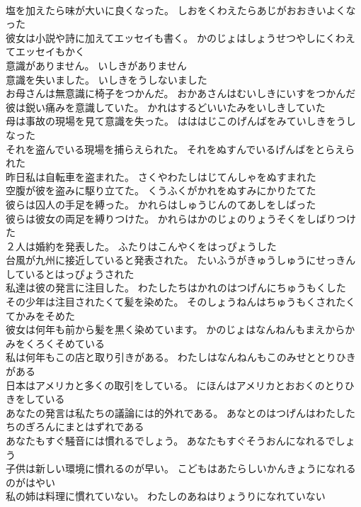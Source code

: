 \documentclass[8pt]{extreport}
\begin{document}
\begin{CJK}{UTF8}{min}
\\	塩を加えたら味が大いに良くなった。	しおをくわえたらあじがおおきいよくなった 
\\	彼女は小説や詩に加えてエッセイも書く。	かのじょはしょうせつやしにくわえてエッセイもかく 
\\	意識がありません。	いしきがありません 
\\	意識を失いました。	いしきをうしないました 
\\	お母さんは無意識に椅子をつかんだ。	おかあさんはむいしきにいすをつかんだ 
\\	彼は鋭い痛みを意識していた。	かれはするどいいたみをいしきしていた 
\\	母は事故の現場を見て意識を失った。	はははじこのげんばをみていしきをうしなった 
\\	それを盗んでいる現場を捕らえられた。	それをぬすんでいるげんばをとらえられた 
\\	昨日私は自転車を盗まれた。	さくやわたしはじてんしゃをぬすまれた 
\\	空腹が彼を盗みに駆り立てた。	くうふくがかれをぬすみにかりたてた 
\\	彼らは囚人の手足を縛った。	かれらはしゅうじんのてあしをしばった 
\\	彼らは彼女の両足を縛りつけた。	かれらはかのじょのりょうそくをしばりつけた 
\\	２人は婚約を発表した。	ふたりはこんやくをはっぴょうした 
\\	台風が九州に接近していると発表された。	たいふうがきゅうしゅうにせっきんしているとはっぴょうされた 
\\	私達は彼の発言に注目した。	わたしたちはかれのはつげんにちゅうもくした 
\\	その少年は注目されたくて髪を染めた。	そのしょうねんはちゅうもくされたくてかみをそめた 
\\	彼女は何年も前から髪を黒く染めています。	かのじょはなんねんもまえからかみをくろくそめている 
\\	私は何年もこの店と取り引きがある。	わたしはなんねんもこのみせととりひきがある 
\\	日本はアメリカと多くの取引をしている。	にほんはアメリカとおおくのとりひきをしている 
\\	あなたの発言は私たちの議論には的外れである。	あなとのはつげんはわたしたちのぎろんにまとはずれである 
\\	あなたもすぐ騒音には慣れるでしょう。	あなたもすぐそうおんになれるでしょう 
\\	子供は新しい環境に慣れるのが早い。	こどもはあたらしいかんきょうになれるのがはやい 
\\	私の姉は料理に慣れていない。	わたしのあねはりょうりになれていない 

\end{CJK}
\end{document}
